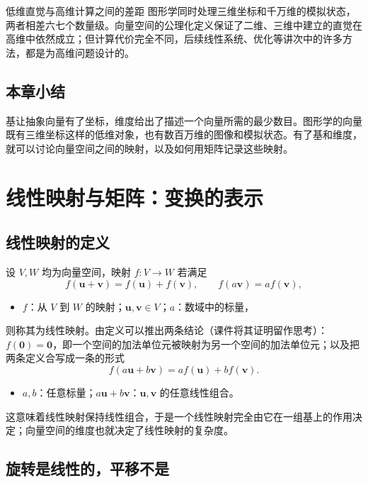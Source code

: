 \documentclass[a4paper]{article}
\begin{document}
\begin{warningbox}{低维直觉与高维计算之间的差距}
图形学同时处理三维坐标和千万维的模拟状态，两者相差六七个数量级。向量空间的公理化定义保证了二维、三维中建立的直觉在高维中依然成立；但计算代价完全不同，后续线性系统、优化等讲次中的许多方法，都是为高维问题设计的。
\end{warningbox}

\subsection{本章小结}

基让抽象向量有了坐标，维度给出了描述一个向量所需的最少数目。图形学的向量既有三维坐标这样的低维对象，也有数百万维的图像和模拟状态。有了基和维度，就可以讨论向量空间之间的映射，以及如何用矩阵记录这些映射。

\section{线性映射与矩阵：变换的表示}

\subsection{线性映射的定义}

设 $V,W$ 均为向量空间，映射 $f:V\to W$ 若满足
\[
f(\boldsymbol u+\boldsymbol v)=f(\boldsymbol u)+f(\boldsymbol v),\qquad f(a\boldsymbol v)=af(\boldsymbol v),
\]
\begin{itemize}
\item $f$：从 $V$ 到 $W$ 的映射；$\boldsymbol u,\boldsymbol v\in V$；$a$：数域中的标量，
\end{itemize}
则称其为线性映射。由定义可以推出两条结论（课件将其证明留作思考）：$f(\boldsymbol 0)=\boldsymbol 0$，即一个空间的加法单位元被映射为另一个空间的加法单位元；以及把两条定义合写成一条的形式
\[
f(a\boldsymbol u+b\boldsymbol v)=af(\boldsymbol u)+bf(\boldsymbol v).
\]
\begin{itemize}
\item $a,b$：任意标量；$a\boldsymbol u+b\boldsymbol v$：$\boldsymbol u,\boldsymbol v$ 的任意线性组合。
\end{itemize}
这意味着线性映射保持线性组合，于是一个线性映射完全由它在一组基上的作用决定；向量空间的维度也就决定了线性映射的复杂度。

\subsection{旋转是线性的，平移不是}
\end{document}
